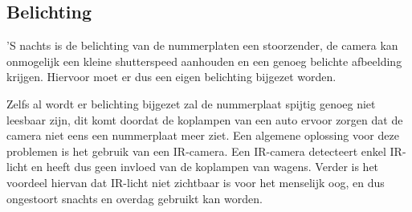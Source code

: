 \subsection{Belichting}
'S nachts is de belichting van de nummerplaten een stoorzender, de camera kan onmogelijk een kleine shutterspeed aanhouden en een genoeg belichte afbeelding krijgen. Hiervoor moet er dus een eigen belichting bijgezet worden.

Zelfs al wordt er belichting bijgezet zal de nummerplaat spijtig genoeg niet leesbaar zijn, dit komt doordat de koplampen van een auto ervoor zorgen dat de camera niet eens een nummerplaat meer ziet. Een algemene oplossing voor deze problemen is het gebruik van een IR-camera. Een IR-camera detecteert enkel IR-licht en heeft dus geen invloed van de koplampen van wagens. Verder is het voordeel hiervan dat IR-licht niet zichtbaar is voor het menselijk oog, en dus ongestoort snachts en overdag gebruikt kan worden.

